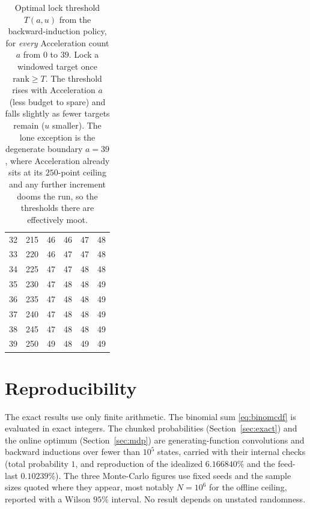 \documentclass[11pt]{article}
\theoremstyle{remark}
\begin{document}
\begin{table}[H]
\begin{tabular}{@{}rr cccc@{}}
32 & 215 & 46 & 46 & 47 & 48 \\
33 & 220 & 46 & 47 & 47 & 48 \\
34 & 225 & 47 & 47 & 48 & 48 \\
35 & 230 & 47 & 48 & 48 & 49 \\
36 & 235 & 47 & 48 & 48 & 49 \\
37 & 240 & 47 & 48 & 48 & 49 \\
38 & 245 & 47 & 48 & 48 & 49 \\
39 & 250 & 49 & 48 & 49 & 49 \\
\bottomrule
\end{tabular}
\caption{Optimal lock threshold $T(a,u)$ from the backward-induction policy, for
\emph{every} Acceleration count $a$ from $0$ to $39$. Lock a windowed target once
$\text{rank}\ge T$. The threshold rises with Acceleration $a$ (less budget to spare)
and falls slightly as fewer targets remain ($u$ smaller). The lone exception is the
degenerate boundary $a=39$, where Acceleration already sits at its $250$-point ceiling
and any further increment dooms the run, so the thresholds there are effectively moot.}
\label{tab:thresh-full}
\end{table}

\section{Reproducibility}\label{app:repro}
The exact results use only finite arithmetic. The binomial sum
\eqref{eq:binomcdf} is evaluated in exact integers. The chunked probabilities
(Section~\ref{sec:exact}) and the online optimum (Section~\ref{sec:mdp}) are
generating-function convolutions and backward inductions over fewer than $10^{5}$
states, carried with their internal checks (total probability $1$, and reproduction
of the idealized $6.166840\%$ and the feed-last $0.10239\%$). The three Monte-Carlo
figures use fixed seeds and the sample sizes quoted where they appear, most notably
$N=10^{6}$ for the offline ceiling, reported with a Wilson $95\%$ interval. No
result depends on unstated randomness.
\end{document}
